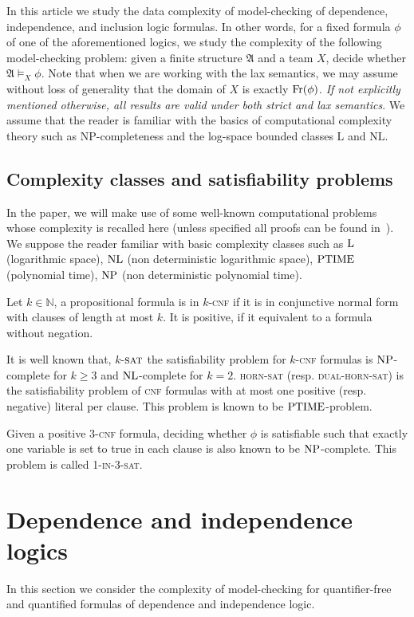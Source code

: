 \documentclass{article}
\theoremstyle{plain}
\theoremstyle{definition}
\newcommand{\mA}{{\mathfrak A}}
\newcommand{\Fr}{{\rm Fr}}
\newcommand{\np}{{\rm NP}}
\newcommand{\Ptime}{{\rm PTIME}}
\newcommand{\nl}{{\rm NL}}
\newcommand{\logspace}{{\rm L}}
\newcommand{\pb}[1]{\textsc{#1}}
\begin{document}
In this article we study the  data complexity  of model-checking  of dependence, independence, and inclusion logic formulas. In other words, for a fixed formula $\phi$ of one of the aforementioned logics, we study the complexity of the following model-checking  problem:  given a finite structure  $\mA$ and a team $X$,  decide whether $\mA\models_X\phi$. 
Note that when we are working with the lax semantics, we may assume without loss of generality that the  domain of $X$ is exactly $\Fr(\phi)$. \emph{If not explicitly mentioned otherwise, all  results are valid under both strict and lax semantics}.
We assume that the reader is familiar with the basics of computational 
complexity theory such as NP-completeness and the log-space bounded classes $\mathrm{L}$ and $\mathrm{NL}$.

\subsection{Complexity classes and satisfiability problems}

In the paper, we will make use of some well-known computational problems whose complexity is recalled here (unless specified all proofs can be found in~\cite{GareyJ1979}). We suppose the reader familiar with basic complexity classes such as $\logspace$ (logarithmic space), $\nl$ (non deterministic logarithmic space), $\Ptime$ (polynomial time), $\np$ (non deterministic polynomial time).

Let $k\in \mathbb{N}$, a propositional formula is in $k$-\pb{cnf} if it is in conjunctive normal form with clauses of length at most $k$. It is positive, if it equivalent to a formula without negation. 

It is well known that, $k$-$\pb{sat}$ the satisfiability problem for $k$-\pb{cnf} formulas is $\np$-complete for $k\geq 3$ and $\nl$-complete for $k=2$. \pb{horn-sat} (resp. \pb{dual-horn-sat}) is the satisfiability problem of \pb{cnf} formulas with at most one positive (resp. negative) literal per clause. This problem is known to be $\Ptime$-problem.

Given a positive $3$-\pb{cnf} formula, deciding whether $\phi$ is satisfiable such that exactly one variable is set to true in each clause is also known to be $\np$-complete. This problem is called \pb{1-in-3-sat}.  


\section{Dependence and independence logics}In this section we consider the complexity of model-checking for quantifier-free and quantified  formulas of dependence and independence logic. 
\end{document}
